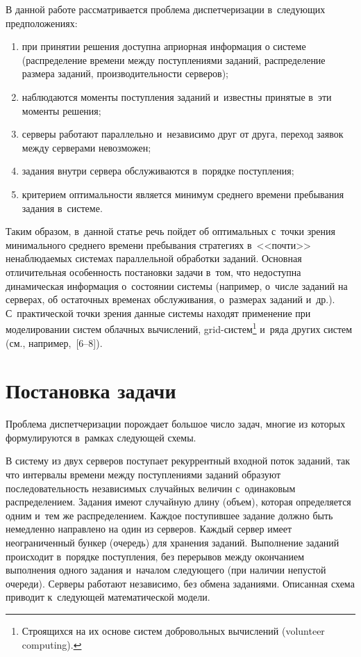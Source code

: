 \begin{multicols}{2}
    В данной работе рассматривается проблема диспетчеризации в~следующих 
предположениях:
    \begin{enumerate}[(1)]
\item при принятии решения доступна априорная информация о системе 
(распределение времени между поступлениями заданий, распределение размера 
заданий, производительности серверов);
\item наблюдаются моменты поступления заданий и~известны принятые в~эти 
моменты решения;
\item серверы работают параллельно и~независимо друг от друга, переход заявок 
между серверами невозможен;
\item задания внутри сервера обслуживаются в~порядке поступления;
\item критерием оптимальности является минимум среднего времени пребывания 
задания в~сис\-теме.
\end{enumerate}
    
    
    Таким образом, в~данной статье речь пойдет об оптимальных с~точки зрения 
минимального среднего времени пребывания стратегиях в~<<почти>> ненаблюдаемых 
системах параллельной обработки заданий. Основная отличительная особенность 
постановки задачи в~том, что недоступна динамическая информация о~со\-сто\-янии 
системы (например, о~чис\-ле заданий на серверах, об остаточных временах 
обслуживания, о~размерах заданий и~др.). С~практической точки зрения данные системы 
находят применение при моделировании систем облачных вычислений, 
grid-систем\footnote{Строящихся на их основе систем добровольных вычислений (volunteer 
computing).} и~ряда других систем (см., например,~[6--8]).

\section{Постановка задачи}

    Проблема диспетчеризации порождает большое число задач, многие из которых 
формулируются в~рамках следующей схемы.
    
    В систему из двух серверов поступает рекуррентный входной поток заданий, так что 
интервалы времени между поступлениями заданий образуют последовательность 
независимых случайных величин с~одинаковым распределением. Задания имеют 
случайную длину (объем), которая определяется одним и~тем же распределением. Каждое 
поступившее задание должно быть немедленно направлено на один из серверов. Каждый 
сервер имеет неограниченный бункер (очередь) для хранения заданий. Выполнение 
заданий происходит в~порядке поступления, без перерывов между окончанием 
выполнения одного задания и~началом следующего (при наличии непустой очереди). 
Серверы работают независимо, без обмена заданиями. Описанная схема приводит 
к~следующей математической модели.
    

\end{multicols}

